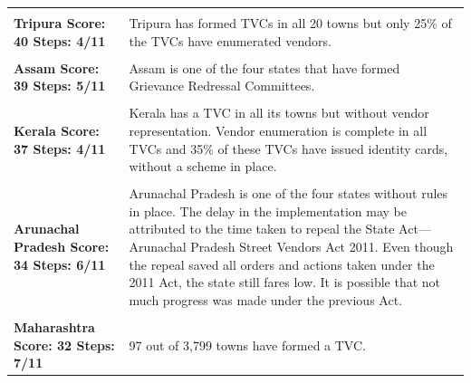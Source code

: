 \documentclass[a4paper, 12pt, twoside, table]{article}
\begin{document}
{\begin{longtable}[l]{>{\raggedright}p{4cm}>{\raggedright\arraybackslash}p{10cm}}
\cellcolor{SVACyellow1} & \cellcolor{SVACyellow2} \\

\cellcolor{SVACyellow1}\bf{Tripura}
\newline
\bf{Score: 40}
\newline
\bf{Steps: 4/11} & \cellcolor{SVACyellow2}Tripura has formed TVCs in all 20 towns but only 25\% of the TVCs have enumerated vendors. \\

\cellcolor{SVACyellow1} & \cellcolor{SVACyellow2} \\

\cellcolor{SVACyellow1}\bf{Assam}
\newline
\bf{Score: 39}
\newline
\bf{Steps: 5/11} & \cellcolor{SVACyellow2}Assam is one of the four states that have formed Grievance Redressal Committees. \\

\cellcolor{SVACyellow1} & \cellcolor{SVACyellow2} \\

\cellcolor{SVACyellow1}\bf{Kerala}
\newline
\bf{Score: 37}
\newline
\bf{Steps: 4/11} & \cellcolor{SVACyellow2}Kerala has a TVC in all its towns but without vendor representation. Vendor enumeration is complete in all TVCs and 35\% of these TVCs have issued identity cards, without a scheme in place. \\

\cellcolor{SVACyellow1} & \cellcolor{SVACyellow2} \\

\cellcolor{SVACyellow1}\bf{Arunachal Pradesh}
\newline
\bf{Score: 34}
\newline
\bf{Steps: 6/11} & \cellcolor{SVACyellow2}Arunachal Pradesh is one of the four states without rules in place. The delay in the implementation may be attributed to the time taken to repeal the State Act---Arunachal Pradesh Street Vendors Act 2011. Even though the repeal saved all orders and actions taken under the 2011 Act, the state still fares low. It is possible that not much progress was made under the previous Act. \\

\cellcolor{SVACyellow1} & \cellcolor{SVACyellow2} \\

\cellcolor{SVACyellow1}\bf{Maharashtra}
\newline
\bf{Score: 32}
\newline
\bf{Steps: 7/11} & \cellcolor{SVACyellow2}97 out of 3,799 towns have formed a TVC. \\


\end{longtable}}
\end{document}
